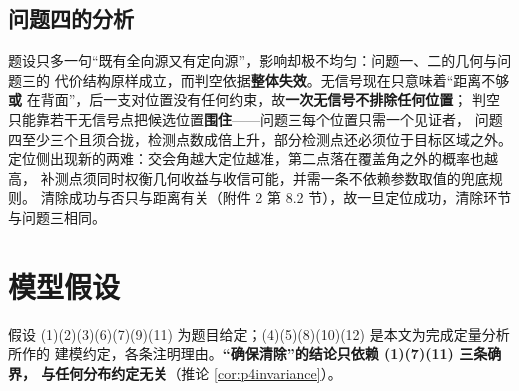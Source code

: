 \documentclass[withoutpreface, bwprint]{cumcmthesis}
\begin{document}
\subsection{问题四的分析}
\label{ssec:p4analysis}

题设只多一句“既有全向源又有定向源”，影响却极不均匀：问题一、二的几何与问题三的
代价结构原样成立，而判空依据\textbf{整体失效}。无信号现在只意味着“距离不够\textbf{或}
在背面”，后一支对位置没有任何约束，故\textbf{一次无信号不排除任何位置}；
判空只能靠若干无信号点把候选位置\textbf{围住}——问题三每个位置只需一个见证者，
问题四至少三个且须合拢，检测点数成倍上升，部分检测点还必须位于目标区域之外。
定位侧出现新的两难：交会角越大定位越准，第二点落在覆盖角之外的概率也越高，
补测点须同时权衡几何收益与收信可能，并需一条不依赖参数取值的兜底规则。
清除成功与否只与距离有关（附件 2 第 8.2 节），故一旦定位成功，清除环节与问题三相同。

\section{模型假设}

假设 (1)(2)(3)(6)(7)(9)(11) 为题目给定；(4)(5)(8)(10)(12) 是本文为完成定量分析所作的
建模约定，各条注明理由。\textbf{“确保清除”的结论只依赖 (1)(7)(11) 三条确界，
与任何分布约定无关}（推论 \ref{cor:p4invariance}）。
\end{document}
